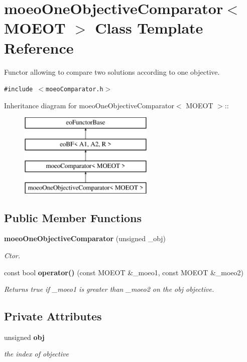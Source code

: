 \section{moeo\-One\-Objective\-Comparator$<$ MOEOT $>$ Class Template Reference}
\label{classmoeoOneObjectiveComparator}
Functor allowing to compare two solutions according to one objective.  


{\tt \#include $<$moeo\-Comparator.h$>$}

Inheritance diagram for moeo\-One\-Objective\-Comparator$<$ MOEOT $>$::\begin{figure}[H]
\begin{center}
\leavevmode
\includegraphics[height=4cm]{classmoeoOneObjectiveComparator}
\end{center}
\end{figure}
\subsection*{Public Member Functions}
\begin{CompactItemize}
\item 
{\bf moeo\-One\-Objective\-Comparator} (unsigned \_\-obj)
\begin{CompactList}\small\item\em Ctor. \item\end{CompactList}\item 
const bool {\bf operator()} (const MOEOT \&\_\-moeo1, const MOEOT \&\_\-moeo2)
\begin{CompactList}\small\item\em Returns true if \_\-moeo1 is greater than \_\-moeo2 on the obj objective. \item\end{CompactList}\end{CompactItemize}
\subsection*{Private Attributes}
\begin{CompactItemize}
\item 
unsigned {\bf obj}\label{classmoeoOneObjectiveComparator_210e1300281084eb5f9dd378e6ac5a32}

\begin{CompactList}\small\item\em the index of objective \item\end{CompactList}\end{CompactItemize}


